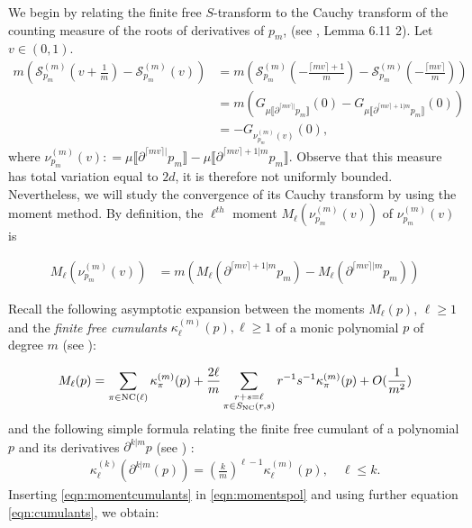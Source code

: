 \documentclass[12pt,reqno]{amsart}
\newcommand{\ceil}[1]{\lceil {#1} \rceil}
\begin{document}
    
	We begin by relating the finite free $S$-transform to the Cauchy transform of the counting measure of the roots of derivatives of $p_m$, (see \cite{arizmendi2024s}, Lemma 6.11 2). Let $v \in (0,1)$.
	\begin{align*}
		m(\mathcal{S}^{(m)}_{p_m}(v+\frac{1}{m}) - \mathcal{S}_{p_m}^{(m)}(v)) &= m(\mathcal{S}^{(m)}_{p_m}(-\frac{\ceil{mv}+1}{m}) - \mathcal{S}^{(m)}_{p_m}(-\frac{\ceil{mv}}{m})) \\
		& = m(G_{\mu\llbracket \partial^{\ceil{mv}|} p_m \rrbracket}(0)-G_{\mu\llbracket \partial^{\ceil{mv}+1|m} p_m \rrbracket}(0))                          \\ 
		&=-G_{\nu^{(m)}_{p_m}(v)}(0),
	\end{align*}
	where $\nu^{(m)}_{p_m}(v) : = \mu\llbracket \partial^{\ceil{mv}|} p_m \rrbracket - \mu\llbracket \partial^{\ceil{mv}+1|m} p_m \rrbracket$.
	Observe that this measure has total variation equal to $2d$, it is therefore not uniformly bounded. Nevertheless, we will study the convergence of its Cauchy transform by using the moment method. By definition, the $\ell^{th}$ moment $M_\ell(\nu_{p_m}^{(m)}(v))$ of $\nu_{p_m}^{(m)}(v)$ is
    
	\begin{align}
        \label{eqn:momentspol}
		 M_\ell(\nu_{p_m}^{(m)}(v)) & = m(M_{\ell}( \partial^{\ceil{mv}+1|m}p_m) - M_{\ell}( \partial^{\ceil{mv}|m}p_m )) 	
    \end{align}
    
	Recall the following asymptotic expansion between the moments $M_{\ell}(p),\, \ell \geq 1$ and the \emph{finite free cumulants} $\kappa^{(m)}_{\ell}(p),\ell \geq 1$ of a monic polynomial $p$ of degree $m$ (see \cite{arizmendi2018cumulants}):

	\begin{align}
		\label{eqn:momentcumulants}
		M_{\ell}(p) =\sum_{\pi \in {\rm NC }(\ell)} \kappa^{(m)}_{\pi}(p) +\frac{2\ell}{m} \sum_{\substack{r+s = \ell \\ \pi \in S_{{\rm NC }}(r,s)}} r^{-1}s^{-1}\kappa^{(m)}_{\pi}(p)+ O(\frac{1}{m^2})
	\end{align}
	and the following simple formula relating the finite free cumulant of a polynomial $p$ and its derivatives $\partial^{k|m}p$ (see \cite{arizmendi2024s}) :
	\begin{align}
		\label{eqn:cumulants}
		\kappa^{(k)}_{\ell}(\partial^{k|m}(p)) =
		(\frac{k}{m})^{\ell-1}\kappa^{(m)}_{\ell}(p),\quad \ell \leq k.
	\end{align}
	Inserting \eqref{eqn:momentcumulants} in \eqref{eqn:momentspol} and using further equation \eqref{eqn:cumulants}, we obtain:
\end{document}
